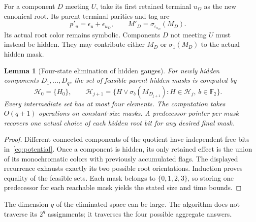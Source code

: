\documentclass[11pt,letterpaper]{article}
\newtheorem{lemma}[theorem]{Lemma}
\theoremstyle{definition}
\theoremstyle{remark}\newtheorem{remark}[theorem]{Remark}
\newcommand{\F}{\mathbb F}
\newcommand{\sw}{\sigma}
\begin{document}
For a component $D$ meeting $U$, take its first retained terminal $u_D$ as the new canonical root. Its parent terminal parities and tag are
\begin{equation}\label{eq:renormalize}
 p'_u=\epsilon_u+\epsilon_{u_D},\qquad
 M'_D=\sw_{\epsilon_{u_D}}(M_D).
\end{equation}
Its actual root color remains symbolic. Components $D$ not meeting $U$ must instead be hidden. They may contribute either $M_D$ or $\sw_1(M_D)$ to the actual hidden mask.

\begin{lemma}[Four-state elimination of hidden gauges]\label{lem:forget}
For newly hidden components $D_1,\ldots,D_q$, the set of feasible parent hidden masks is computed by
\[
 \mathcal H_0=\{H_0\},\qquad
 \mathcal H_{j+1}=\{H\lor\sw_b(M_{D_{j+1}}):H\in\mathcal H_j,\ b\in\F_2\}.
\]
Every intermediate set has at most four elements. The computation takes $O(q+1)$ operations on constant-size masks. A predecessor pointer per mask recovers one actual choice of each hidden root bit for any desired final mask.
\end{lemma}
\begin{proof}
Different connected components of the quotient have independent free bits in~\eqref{eq:potential}. Once a component is hidden, its only retained effect is the union of its monochromatic colors with previously accumulated flags. The displayed recurrence exhausts exactly its two possible root orientations. Induction proves equality of the feasible sets. Each mask belongs to $\{0,1,2,3\}$, so storing one predecessor for each reachable mask yields the stated size and time bounds.
\end{proof}
The dimension $q$ of the eliminated space can be large. The algorithm does not traverse its $2^q$ assignments; it traverses the four possible aggregate answers.
\end{document}
